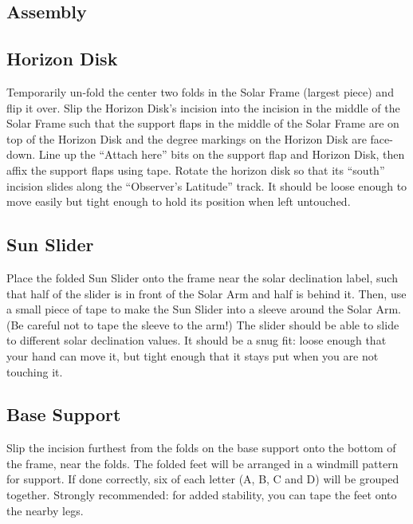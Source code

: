 \documentclass[tikz]{article}
\begin{document}
\begin{multicols}{2}
	
	
	
	\section{Assembly}
	\subsection{Horizon Disk}
	Temporarily un-fold the center two folds in the Solar Frame (largest piece) and flip it over. Slip the Horizon Disk's incision into the incision in the middle of the Solar Frame such that the support flaps in the middle of the Solar Frame are on top of the Horizon Disk and the degree markings on the Horizon Disk are face-down. Line up the ``Attach here'' bits on the support flap and Horizon Disk, then affix the support flaps using tape. Rotate the horizon disk so that its ``south'' incision slides along the ``Observer's Latitude'' track. It should be loose enough to move easily but tight enough to hold its position when left untouched.
	
	\subsection{Sun Slider}
	Place the folded Sun Slider onto the frame near the solar declination label, such that half of the slider is in front of the Solar Arm and half is behind it. Then, use a small piece of tape to make the Sun Slider into a sleeve around the Solar Arm. (Be careful not to tape the sleeve to the arm!) The slider should be able to slide to different solar declination values. It should be a snug fit: loose enough that your hand can move it, but tight enough that it stays put when you are not touching it. 
	
	\subsection{Base Support}
	Slip the incision furthest from the folds on the base support onto the bottom of the frame, near the folds. The folded feet will be arranged in a windmill pattern for support. If done correctly, six of each letter (A, B, C and D) will be grouped together. Strongly recommended: for added stability, you can tape the feet onto the nearby legs. 
	

\end{multicols}
\end{document}
